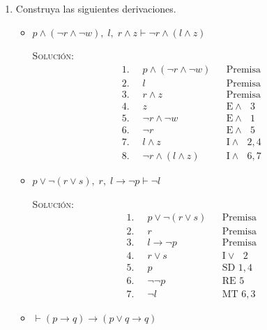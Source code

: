 \documentclass[letterpaper,11pt]{article}
\begin{document}
\begin{enumerate}
    \item Construya las siguientes derivaciones.

    \begin{itemize}
        \item $p \land (\neg r \land \neg w), \; l, \; r \land z ⊢ \neg r 
               \land (l \land z)$
        
        \textsc{Solución:}
        \begin{align*}
            1.& \; \; p \land (\neg r \land \neg w)
            && \text{Premisa} \\ 
            2.& \; \; l
            && \text{Premisa} \\ 
            3.& \; \; r \land z
            && \text{Premisa} \\ 
            4.& \; \; z
            && \text{E$\land$ $3$} \\ 
            5.& \; \; \neg r \land \neg w
            && \text{E$\land$ $1$} \\
            6.& \; \; \neg r
            && \text{E$\land$ $5$} \\ 
            7.& \; \; l \land z
            && \text{I$\land$ $2,4$} \\ 
            8.& \; \; \neg r \land (l \land z)
            && \text{I$\land$ $6, 7$}
        \end{align*}

        \item $p \lor \neg(r \lor s), \; r, \; l → \neg p ⊢ \neg l$
        
        \textsc{Solución:}
        \begin{align*}
            1.& \; \; p \lor \neg(r \lor s)
            && \text{Premisa} \\ 
            2.& \; \; r
            && \text{Premisa} \\ 
            3.& \; \; l → \neg p
            && \text{Premisa} \\ 
            4.& \; \; r \lor s
            && \text{I$\lor$ $2$} \\
            5.& \; \; p
            && \text{SD $1, 4$} \\ 
            6.& \; \; \neg \neg p
            && \text{RE $5$} \\ 
            7.& \; \; \neg l
            && \text{MT $6, 3$}
        \end{align*}

        \item $⊢(p → q) → (p \lor q → q)$


\end{itemize}
\end{enumerate}
\end{document}
